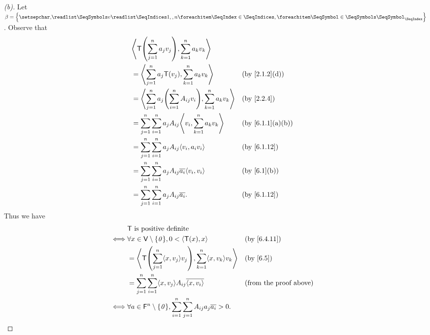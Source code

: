 \begin{proof}[(b)]
  Let \(\beta = \set{\seq{v}{1,,n}}\).
  Observe that
  \begin{align*}
     & \inn{\T\pa{\sum_{j = 1}^n a_j v_j}, \sum_{k = 1}^n a_k v_k}                                                            \\
     & = \inn{\sum_{j = 1}^n a_j \T(v_j), \sum_{k = 1}^n a_k v_k}                         &  & \text{(by \cref{2.1.2}(d))}    \\
     & = \inn{\sum_{j = 1}^n a_j \pa{\sum_{i = 1}^n A_{i j} v_i}, \sum_{k = 1}^n a_k v_k} &  & \text{(by \cref{2.2.4})}       \\
     & = \sum_{j = 1}^n \sum_{i = 1}^n a_j A_{i j} \inn{v_i, \sum_{k = 1}^n a_k v_k}      &  & \text{(by \cref{6.1.1}(a)(b))} \\
     & = \sum_{j = 1}^n \sum_{i = 1}^n a_j A_{i j} \inn{v_i, a_i v_i}                     &  & \text{(by \cref{6.1.12})}      \\
     & = \sum_{j = 1}^n \sum_{i = 1}^n a_j A_{i j} \conj{a_i} \inn{v_i, v_i}              &  & \text{(by \cref{6.1}(b))}      \\
     & = \sum_{j = 1}^n \sum_{i = 1}^n a_j A_{i j} \conj{a_i}.                            &  & \text{(by \cref{6.1.12})}
  \end{align*}
  Thus we have
  \begin{align*}
         & \T \text{ is positive definite}                                                                                                          \\
    \iff & \forall x \in \V \setminus \set{\zv}, 0 < \inn{\T(x), x}                                              &  & \text{(by \cref{6.4.11})}     \\
         & = \inn{\T\pa{\sum_{j = 1}^n \inn{x, v_j} v_j}, \sum_{k = 1}^n \inn{x, v_k} v_k}                       &  & \text{(by \cref{6.5})}        \\
         & = \sum_{j = 1}^n \sum_{i = 1}^n \inn{x, v_j} A_{i j} \conj{\inn{x, v_i}}                              &  & \text{(from the proof above)} \\
    \iff & \forall a \in \vs{F}^n \setminus \set{\zv}, \sum_{i = 1}^n \sum_{j = 1}^n A_{i j} a_j \conj{a_i} > 0.
  \end{align*}
\end{proof}

